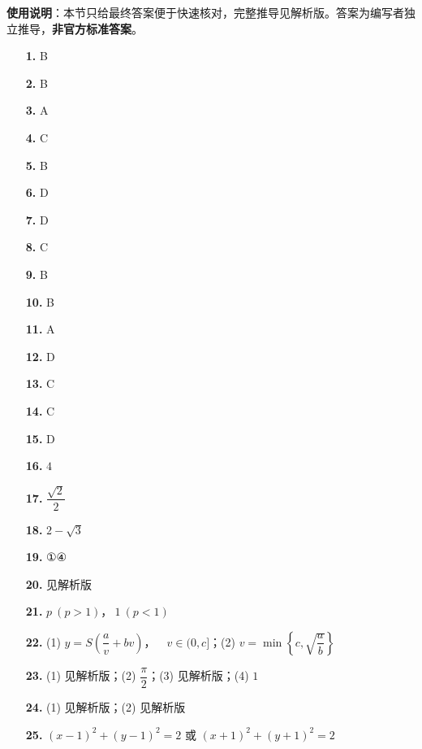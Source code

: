 
\begin{gknotice}
\textbf{使用说明}：本节只给最终答案便于快速核对，完整推导见解析版。答案为编写者独立推导，\textbf{非官方标准答案}。
\end{gknotice}

\begin{itemize}[leftmargin=2.6em]
  \item[\textbf{1.}] B
  \item[\textbf{2.}] B
  \item[\textbf{3.}] A
  \item[\textbf{4.}] C
  \item[\textbf{5.}] B
  \item[\textbf{6.}] D
  \item[\textbf{7.}] D
  \item[\textbf{8.}] C
  \item[\textbf{9.}] B
  \item[\textbf{10.}] B
  \item[\textbf{11.}] A
  \item[\textbf{12.}] D
  \item[\textbf{13.}] C
  \item[\textbf{14.}] C
  \item[\textbf{15.}] D
  \item[\textbf{16.}] $4$
  \item[\textbf{17.}] $\dfrac{\sqrt2}{2}$
  \item[\textbf{18.}] $2-\sqrt3$
  \item[\textbf{19.}] ①④
  \item[\textbf{20.}] 见解析版
  \item[\textbf{21.}] $p\ (p>1)\text{，}\ 1\ (p<1)$
  \item[\textbf{22.}] (1) $y=S\left(\dfrac av+bv\right)\text{，}\quad v\in(0,c]$；(2) $v=\min\left\{c,\sqrt{\dfrac ab}\right\}$
  \item[\textbf{23.}] (1) 见解析版；(2) $\dfrac\pi2$；(3) 见解析版；(4) $1$
  \item[\textbf{24.}] (1) 见解析版；(2) 见解析版
  \item[\textbf{25.}] $(x-1)^2+(y-1)^2=2$ 或 $(x+1)^2+(y+1)^2=2$
\end{itemize}
